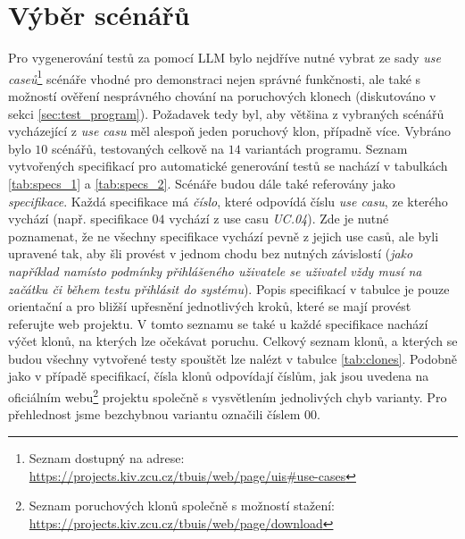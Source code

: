 \documentclass[czech, ma, kiv, he, iso690alph, pdf, viewonly]{fasthesis}
\begin{document}
    \section{Výběr scénářů} \label{sec:scenarios}

    Pro vygenerování testů za pomocí LLM bylo nejdříve nutné vybrat ze sady \textit{use caseů}\footnote{Seznam dostupný na adrese: \url{https://projects.kiv.zcu.cz/tbuis/web/page/uis#use-cases}} scénáře vhodné pro demonstraci nejen správné funkčnosti, ale také s možností ověření nesprávného chování na poruchových klonech (diskutováno v sekci \ref{sec:test_program}). Požadavek tedy byl, aby většina z vybraných scénářů vycházející z \textit{use casu} měl alespoň jeden poruchový klon, případně více. Vybráno bylo \(10\) scénářů, testovaných celkově na \(14\) variantách programu. Seznam vytvořených specifikací pro automatické generování testů se nachází v tabulkách \ref{tab:specs_1} a \ref{tab:specs_2}. Scénáře budou dále také referovány jako \textit{specifikace}. Každá specifikace má \textit{číslo}, které odpovídá číslu \textit{use casu}, ze kterého vychází (např. specifikace \(04\) vychází z use casu \textit{UC.04}). Zde je nutné poznamenat, že ne všechny specifikace vychází pevně z jejich use casů, ale byli upravené tak, aby šli provést v jednom chodu bez nutných závislostí (\textit{jako například namísto podmínky přihlášeného uživatele se uživatel vždy musí na začátku či během testu přihlásit do systému}). Popis specifikací v tabulce je pouze orientační a pro bližší upřesnění jednotlivých kroků, které se mají provést referujte web projektu. V tomto seznamu se také u každé specifikace nachází výčet klonů, na kterých lze očekávat poruchu. Celkový seznam klonů, a kterých se budou všechny vytvořené testy spouštět lze nalézt v tabulce \ref{tab:clones}. Podobně jako v případě specifikací, čísla klonů odpovídají číslům, jak jsou uvedena na oficiálním webu\footnote{Seznam poruchových klonů společně s možností stažení: \url{https://projects.kiv.zcu.cz/tbuis/web/page/download}} projektu společně s vysvětlením jednolivých chyb varianty. Pro přehlednost jsme bezchybnou variantu označili číslem \(00\).

    \vfill
\end{document}
